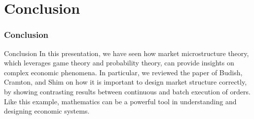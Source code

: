 \documentclass{beamer}
\begin{document}
\section{Conclusion}
\begin{frame}
    \frametitle{Conclusion}
    \begin{block}{Conclusion}
        In this presentation, we have seen how market microstructure theory, which leverages game theory and probability theory, can provide insights on complex economic phenomena. In particular, we reviewed the paper of Budish, Cramton, and Shim on how it is important to design market structure correctly, by showing contrasting results between continuous and batch execution of orders. Like this example, mathematics can be a powerful tool in understanding and designing economic systems.
    \end{block}
\end{frame}
\end{document}
